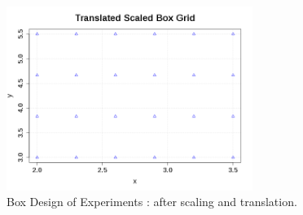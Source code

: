             \begin{figure}[H]
               \begin{center}
                 \includegraphics[width=8cm]{Figures/TranslatedScaledBoxGrid.png}
               \end{center}
               \caption{Box Design of Experiments  : after scaling and translation.}
               \label{TranslatedScaledBoxGrid}
             \end{figure}
